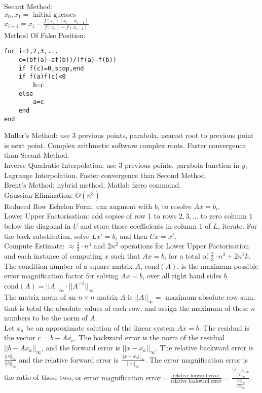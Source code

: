 Secant Method: \\
$x_0,x_1 = \text{ initial guesses}$ \\
$x_{i+1} = x_i - \frac{f(x_i)(x_i-x_{i-1})}{f(x_i)-f(x_{i-1})}$ \\
Method Of False Position:
\begin{verbatim}
for i=1,2,3,...
    c=(bf(a)-af(b))/(f(a)-f(b))
    if f(c)=0,stop,end
    if f(a)f(c)<0
        b=c
    else
        a=c
    end
end
\end{verbatim}
Muller's Method: use $3$ previous points, parabola, nearest root to previous point is next point. Complex arithmetic software complex roots. Faster convergence than Secant Method. \\
Inverse Quadratic Interpolation: use $3$ previous points, parabola function in $y$, Lagrange Interpolation. Faster convergence than Second Method. \\
Brent's Method: hybrid method, Matlab fzero command. \\
Gaussian Elimination: $O(n^3)$ \\
Reduced Row Echelon Form: can augment with $b_i$ to resolve $Ax = b_i$. \\
Lower Upper Factorisation: add copies of row $1$ to rows $2,3,\dots$ to zero column $1$ below the diagonal in $U$ and store those coefficients in column $1$ of $L$, iterate. For the back substitution, solve $L x' = b_i$ and then $U x = x'$. \\
Compute Estimate: $\approx \frac{2}{3} \cdot n^3$ and $2n^2$ operations for Lower Upper Factorisation and each instance of computing $x$ such that $Ax = b_i$ for a total of $\frac{2}{3} \cdot n^2 + 2 n^2 k$. \\
The condition number of a square matrix $A$, $\text{cond}(A)$, is the maximum possible error magnification factor for solving $Ax = b$, over all right hand sides $b$. $\text{cond}(A) = ||A||_{\infty} \cdot || A^{-1} ||_{\infty}$. \\
The matrix norm of an $n \times n$ matrix $A$ is $||A||_{\infty} = \text{ maximum absolute row sum}$, that is total the absolute values of each row, and assign the maximum of these $n$ numbers to be the norm of $A$. \\
Let $x_a$ be an approximate solution of the linear system $Ax = b$. The residual is the vector $r = b-Ax_a$. The backward error is the norm of the residual $|| b-Ax_a ||_{\infty}$, and the forward error is $|| x-x_a ||_{\infty}$. The relative backward error is $\frac{||r||_{\infty}}{||b||_{\infty}}$ and the relative forward error is $\frac{||x-x_a||_{\infty}}{||x||_{\infty}}$. The error magnification error is the ratio of those two, or $\text{error magnification error} = \frac{\text{relative forward error}}{\text{relative backward error}} = \frac{\frac{||x-x_a||_{\infty}}{||x||_{\infty}}}{\frac{||r||_{\infty}}{||b||_{\infty}}}$. \\

